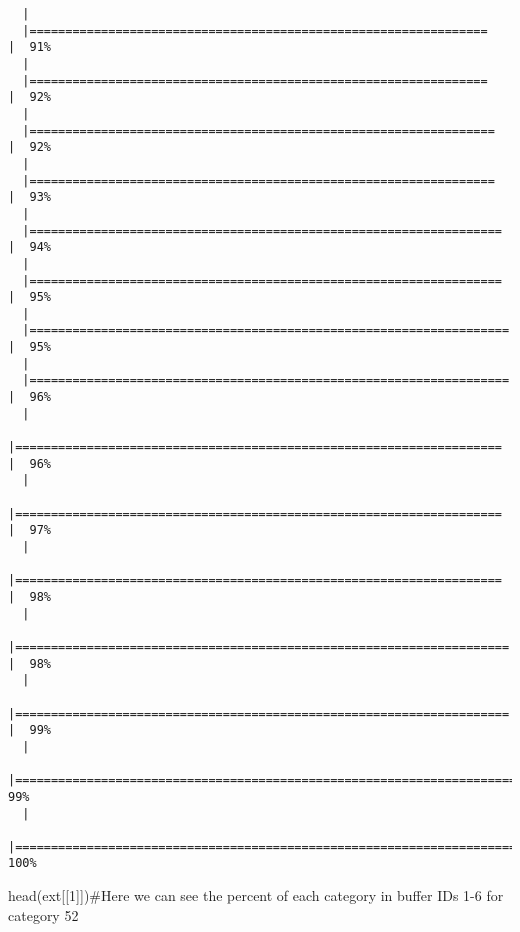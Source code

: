 \documentclass[
  letterpaper,
]{book}
\newenvironment{Shaded}{\begin{snugshade}}{\end{snugshade}}
\newcommand{\CommentTok}[1]{\textcolor[rgb]{0.37,0.37,0.37}{#1}}
\newcommand{\DecValTok}[1]{\textcolor[rgb]{0.68,0.00,0.00}{#1}}
\newcommand{\FunctionTok}[1]{\textcolor[rgb]{0.28,0.35,0.67}{#1}}
\newcommand{\NormalTok}[1]{\textcolor[rgb]{0.00,0.23,0.31}{#1}}
\begin{document}
\begin{verbatim}
  |                                                                            
  |================================================================      |  91%
  |                                                                            
  |================================================================      |  92%
  |                                                                            
  |=================================================================     |  92%
  |                                                                            
  |=================================================================     |  93%
  |                                                                            
  |==================================================================    |  94%
  |                                                                            
  |==================================================================    |  95%
  |                                                                            
  |===================================================================   |  95%
  |                                                                            
  |===================================================================   |  96%
  |                                                                            
  |====================================================================  |  96%
  |                                                                            
  |====================================================================  |  97%
  |                                                                            
  |====================================================================  |  98%
  |                                                                            
  |===================================================================== |  98%
  |                                                                            
  |===================================================================== |  99%
  |                                                                            
  |======================================================================|  99%
  |                                                                            
  |======================================================================| 100%
\end{verbatim}

\begin{Shaded}
\begin{Highlighting}[]
\FunctionTok{head}\NormalTok{(ext[[}\DecValTok{1}\NormalTok{]])}\CommentTok{\#Here we can see the percent of each category in buffer IDs 1{-}6 for category 52}
\end{Highlighting}
\end{Shaded}
\end{document}
